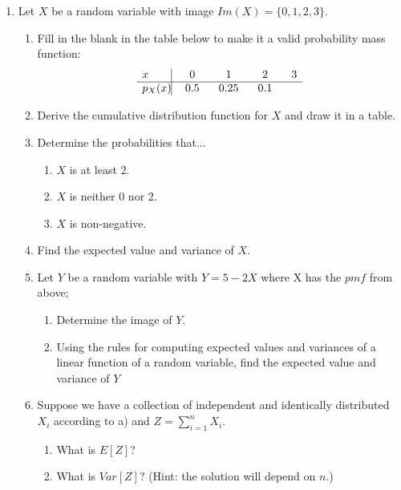 \begin{enumerate}
\item Let $X$ be a random variable with image $Im(X)= \{0,1,2,3\}$.
	\begin{enumerate}
	\item Fill in the blank in the table below to make it a valid probability mass function:
	\[
	\begin{array}{l@{\extracolsep{.1in}}|cccc}
	x & 0 & 1 & 2 & 3 \\ \hline
	p_X(x) & 0.5 & 0.25 & 0.1 & \\
	\end{array}
	\]
	\item Derive the cumulative distribution function for $X$ and draw it in a table. 
	\item Determine the probabilities that... 
		\begin{enumerate}
		\item $X$ is at least 2.
		\item $X$ is neither 0 nor 2.
		\item $X$ is non-negative.
		\end{enumerate}
	\item Find the expected value and variance of $X$.
	\item Let $Y$ be a random variable with $Y = 5-2X$ where X has the $pmf$ from above;
		\begin{enumerate}
		\item Determine the image of $Y$. 
		\item Using the rules for computing expected values and variances of a linear function of a random variable, find the expected value and variance of $Y$
		\end{enumerate}
	\item Suppose we have a collection of independent and identically distributed $X_i$ according to a) and $Z=\sum_{i=1}^n X_i$.
	
		\begin{enumerate}
	 \item What is $E[Z]$?
	 \item What is $Var[Z]$? (Hint: the solution will depend on $n$.)
	 \end{enumerate}
	\end{enumerate}


\end{enumerate}
